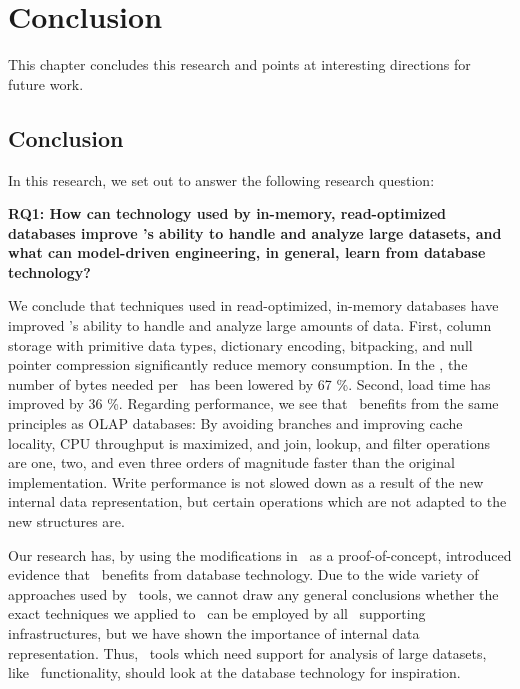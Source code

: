 \chapter{Conclusion}
\label{chap:Conclusion}

This chapter concludes this research and points at interesting directions for future work.

\clearpage

\section{Conclusion}
\label{sec:Conclusion}

In this research, we set out to answer the following research question:

\setlength{\leftskip}{1cm}

\textbf{RQ1: How can technology used by in-memory, read-optimized databases improve \gap's ability to handle and analyze large datasets, and what can model-driven engineering, in general, learn from database technology?}

\setlength{\leftskip}{0pt}

We conclude that techniques used in read-optimized, in-memory databases have improved \gap's ability to handle and analyze large amounts of data. First, column storage with primitive data types, dictionary encoding, bitpacking, and null pointer compression significantly reduce memory consumption. In the \tpchdl, the number of bytes needed per \lineitem~has been lowered by 67 \%. Second, load time has improved by 36 \%. Regarding performance, we see that \gap~benefits from the same principles as OLAP databases: By avoiding branches and improving cache locality, CPU throughput is maximized, and join, lookup, and filter operations are one, two, and even three orders of magnitude faster than the original implementation. Write performance is not slowed down as a result of the new internal data representation, but certain operations which are not adapted to the new structures are.

Our research has, by using the modifications in \gap~as a proof-of-concept, introduced evidence that \mde~benefits from database technology. Due to the wide variety of approaches used by \mdd~tools, we cannot draw any general conclusions whether the exact techniques we applied to \gap~can be employed by all \mde~supporting infrastructures, but we have shown the importance of internal data representation. Thus, \mde~tools which need support for analysis of large datasets, like \bd~functionality, should look at the database technology for inspiration. 

